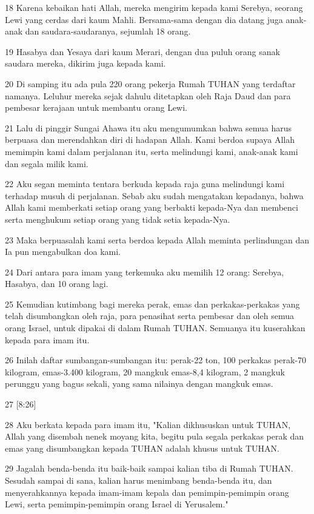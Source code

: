 \par 18 Karena kebaikan hati Allah, mereka mengirim kepada kami Serebya, seorang Lewi yang cerdas dari kaum Mahli. Bersama-sama dengan dia datang juga anak-anak dan saudara-saudaranya, sejumlah 18 orang.
\par 19 Hasabya dan Yesaya dari kaum Merari, dengan dua puluh orang sanak saudara mereka, dikirim juga kepada kami.
\par 20 Di samping itu ada pula 220 orang pekerja Rumah TUHAN yang terdaftar namanya. Leluhur mereka sejak dahulu ditetapkan oleh Raja Daud dan para pembesar kerajaan untuk membantu orang Lewi.
\par 21 Lalu di pinggir Sungai Ahawa itu aku mengumumkan bahwa semua harus berpuasa dan merendahkan diri di hadapan Allah. Kami berdoa supaya Allah memimpin kami dalam perjalanan itu, serta melindungi kami, anak-anak kami dan segala milik kami.
\par 22 Aku segan meminta tentara berkuda kepada raja guna melindungi kami terhadap musuh di perjalanan. Sebab aku sudah mengatakan kepadanya, bahwa Allah kami memberkati setiap orang yang berbakti kepada-Nya dan membenci serta menghukum setiap orang yang tidak setia kepada-Nya.
\par 23 Maka berpuasalah kami serta berdoa kepada Allah meminta perlindungan dan Ia pun mengabulkan doa kami.
\par 24 Dari antara para imam yang terkemuka aku memilih 12 orang: Serebya, Hasabya, dan 10 orang lagi.
\par 25 Kemudian kutimbang bagi mereka perak, emas dan perkakas-perkakas yang telah disumbangkan oleh raja, para penasihat serta pembesar dan oleh semua orang Israel, untuk dipakai di dalam Rumah TUHAN. Semuanya itu kuserahkan kepada para imam itu.
\par 26 Inilah daftar sumbangan-sumbangan itu: perak-22 ton, 100 perkakas perak-70 kilogram, emas-3.400 kilogram, 20 mangkuk emas-8,4 kilogram, 2 mangkuk perunggu yang bagus sekali, yang sama nilainya dengan mangkuk emas.
\par 27 [8:26]
\par 28 Aku berkata kepada para imam itu, "Kalian dikhususkan untuk TUHAN, Allah yang disembah nenek moyang kita, begitu pula segala perkakas perak dan emas yang disumbangkan kepada TUHAN adalah khusus untuk TUHAN.
\par 29 Jagalah benda-benda itu baik-baik sampai kalian tiba di Rumah TUHAN. Sesudah sampai di sana, kalian harus menimbang benda-benda itu, dan menyerahkannya kepada imam-imam kepala dan pemimpin-pemimpin orang Lewi, serta pemimpin-pemimpin orang Israel di Yerusalem."
